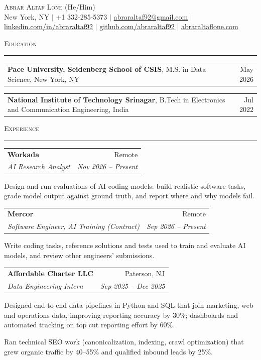 \documentclass[10pt,letterpaper]{article}
\makeatletter
\renewcommand{\section}[1]{%
  \vspace{6pt}%
  {\large\scshape #1}\par
  \vspace{-8pt}\rule{\textwidth}{0.4pt}\par
  \vspace{-1pt}%
}
\newcommand{\entry}[4]{%
  \vspace{3pt}%
  \begin{tabular*}{\textwidth}{l@{\extracolsep{\fill}}r}
    \textbf{#1} & #2 \\[-1pt]
    \textit{\small #3} & \textit{\small #4} \\
  \end{tabular*}\par\vspace{-2pt}%
}
\newcommand{\lineentry}[3]{%
  \vspace{1pt}%
  \begin{tabular*}{\textwidth}{l@{\extracolsep{\fill}}r}
    \textbf{#1}, #2 & #3 \\
  \end{tabular*}\par
}
\newenvironment{bullets}{%
  \begin{list}{\textbullet}{%
    \setlength{\leftmargin}{0.16in}\setlength{\labelwidth}{0.1in}\setlength{\labelsep}{0.06in}%
    \setlength{\itemsep}{0pt}\setlength{\parsep}{0pt}\setlength{\topsep}{1pt}\setlength{\partopsep}{0pt}}%
  \small
}{%
  \end{list}%
}
\makeatother
\begin{document}
\begin{center}
  {\Huge\scshape Abrar Altaf Lone} {\small (He/Him)} \\ \vspace{3pt}
  \footnotesize New York, NY $|$ +1 332-285-5373 $|$
  \href{mailto:abraraltaf92@gmail.com}{abraraltaf92@gmail.com} $|$
  \href{https://www.linkedin.com/in/abraraltaf92}{linkedin.com/in/abraraltaf92} $|$
  \href{https://github.com/abraraltaf92}{github.com/abraraltaf92} $|$
  \href{https://abraraltaflone.com}{abraraltaflone.com}
\end{center}
\vspace{-10pt}

\section{Education}

\lineentry{Pace University, Seidenberg School of CSIS}{M.S. in Data Science, New York, NY}{May 2026}
\lineentry{National Institute of Technology Srinagar}{B.Tech in Electronics and Communication Engineering, India}{Jul 2022}

\section{Experience}

\entry{Workada}{Remote}
      {AI Research Analyst}{Nov 2026 -- Present}
\begin{bullets}
  \item Design and run evaluations of AI coding models: build realistic software tasks, grade model output against ground truth, and report where and why models fail.
\end{bullets}

\entry{Mercor}{Remote}
      {Software Engineer, AI Training (Contract)}{Sep 2026 -- Present}
\begin{bullets}
  \item Write coding tasks, reference solutions and tests used to train and evaluate AI models, and review other engineers' submissions.
\end{bullets}

\entry{Affordable Charter LLC}{Paterson, NJ}
      {Data Engineering Intern}{Sep 2025 -- Dec 2025}
\begin{bullets}
  \item Designed end-to-end data pipelines in Python and SQL that join marketing, web and operations data, improving reporting accuracy by 30\%; dashboards and automated tracking on top cut reporting effort by 60\%.
  \item Ran technical SEO work (canonicalization, indexing, crawl optimization) that grew organic traffic by 40--55\% and qualified inbound leads by 25\%.
\end{bullets}
\end{document}
